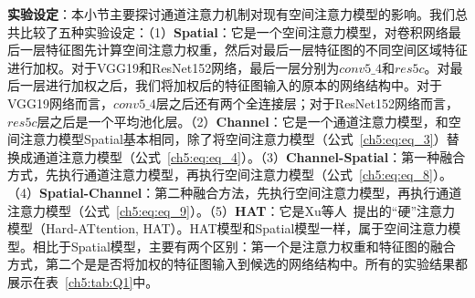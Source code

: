 \textbf{实验设定}：本小节主要探讨通道注意力机制对现有空间注意力模型的影响。我们总共比较了五种实验设定：（1）\textbf{Spatial}：它是一个空间注意力模型，对卷积网络最后一层特征图先计算空间注意力权重，然后对最后一层特征图的不同空间区域特征进行加权。对于VGG19和ResNet152网络，最后一层分别为$conv5\_4$和$res5c$。对最后一层进行加权之后，我们将加权后的特征图输入的原本的网络结构中。对于VGG19网络而言，$conv5\_4$层之后还有两个全连接层；对于ResNet152网络而言，$res5c$层之后是一个平均池化层。（2）\textbf{Channel}：它是一个通道注意力模型，和空间注意力模型Spatial基本相同，除了将空间注意力模型（公式~\eqref{ch5:eq:eq_3}）替换成通道注意力模型（公式~\eqref{ch5:eq:eq_4}）。（3）\textbf{Channel-Spatial}：第一种融合方式，先执行通道注意力模型，再执行空间注意力模型（公式~\eqref{ch5:eq:eq_8}）。（4）\textbf{Spatial-Channel}：第二种融合方法，先执行空间注意力模型，再执行通道注意力模型（公式~\eqref{ch5:eq:eq_9}）。（5）\textbf{HAT}：它是Xu等人~\cite{xu2015show}提出的“硬”注意力模型（Hard-ATtention, HAT）。HAT模型和Spatial模型一样，属于空间注意力模型。相比于Spatial模型，主要有两个区别：第一个是注意力权重和特征图的融合方式，第二个是是否将加权的特征图输入到候选的网络结构中。所有的实验结果都展示在表~\ref{ch5:tab:Q1}中。

